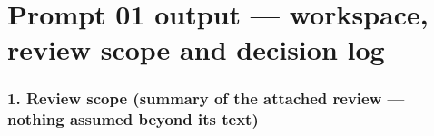 \documentclass[
  10pt,
]{article}
\begin{document}
\newpage

\hypertarget{prompt-01-output-workspace-review-scope-and-decision-log}{%
\section{Prompt 01 output --- workspace, review scope and decision
log}\label{prompt-01-output-workspace-review-scope-and-decision-log}}

\hypertarget{review-scope-summary-of-the-attached-review-nothing-assumed-beyond-its-text}{%
\subsubsection{1. Review scope (summary of the attached review ---
nothing assumed beyond its
text)}\label{review-scope-summary-of-the-attached-review-nothing-assumed-beyond-its-text}}
\end{document}
